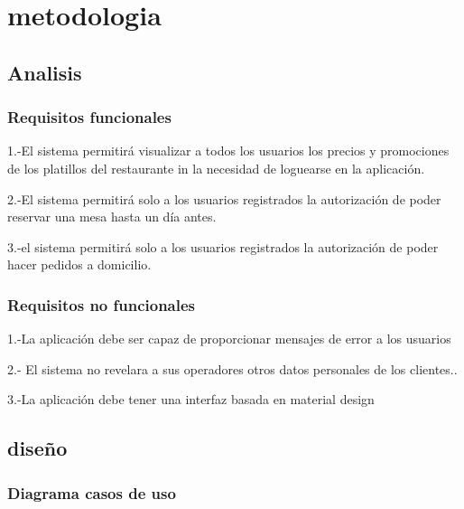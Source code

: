 \chapter{metodologia}




\section{Analisis}



\subsection{Requisitos funcionales}
1.-El sistema permitir\'a visualizar a todos los usuarios los precios y promociones de los platillos del restaurante in la necesidad de loguearse en la aplicaci\'on.

2.-El sistema permitir\'a solo a los usuarios registrados la autorizaci\'on de poder reservar una mesa hasta un d\'ia antes.

3.-el sistema permitir\'a solo a los usuarios registrados la autorizaci\'on de poder hacer pedidos a domicilio.



\subsection{Requisitos no funcionales}
1.-La aplicaci\'on debe ser capaz de proporcionar mensajes de error a los usuarios

2.- El sistema no revelara a sus operadores otros datos personales de los clientes..

3.-La aplicaci\'on debe tener una interfaz basada en material design






\section{diseño}


\subsection{Diagrama casos de uso}

